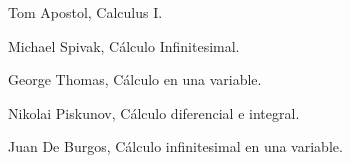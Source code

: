 \let\cleardoublepage\clearpage

\begin{thebibliography}{10}


    \bibitem{} Tom Apostol, Calculus I. 

    \bibitem{} Michael Spivak, Cálculo Infinitesimal. 

    \bibitem{} George Thomas, Cálculo en una variable.	

    \bibitem{} Nikolai Piskunov, Cálculo diferencial e integral.

    \bibitem{} Juan De Burgos, Cálculo infinitesimal en una variable.

\end{thebibliography}
